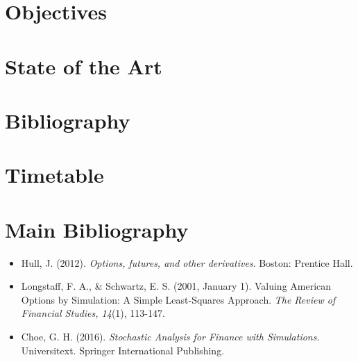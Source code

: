 \documentclass[a4paper,prd,nofootinbib,superscriptaddress,floatfix]{revtex4}
\begin{document}
\section{Objectives}

\section{State of the Art}

\section{Bibliography}

\section{Timetable}

\iffalse
\section{Thesis Supervisors}
\begin{itemize}
  \item Cláudia Nunes Philippart, \ \ cnunes@math.tecnico.ulisboa.pt
  \item Rui Manuel Agostinho Dilão, \ \ ruidilao@tecnico.ulisboa.pt
  \item Claude Yves Cochet, \ \ claude.cochet@bnpparibas.com
\end{itemize}
\fi

\section{Main Bibliography}
\begin{itemize}
\item Hull, J. (2012). \textit{Options, futures, and other derivatives}. Boston: Prentice Hall.

\item Longstaff, F. A., \& Schwartz, E. S. (2001, January 1). Valuing American Options by Simulation: A Simple Least-Squares Approach. \textit{The Review of Financial Studies, 14}(1), 113-147.

\item Choe, G. H. (2016). \textit{Stochastic Analysis for Finance with Simulations}. Universitext. Springer International Publishing. 
\end{itemize}
\end{document}
